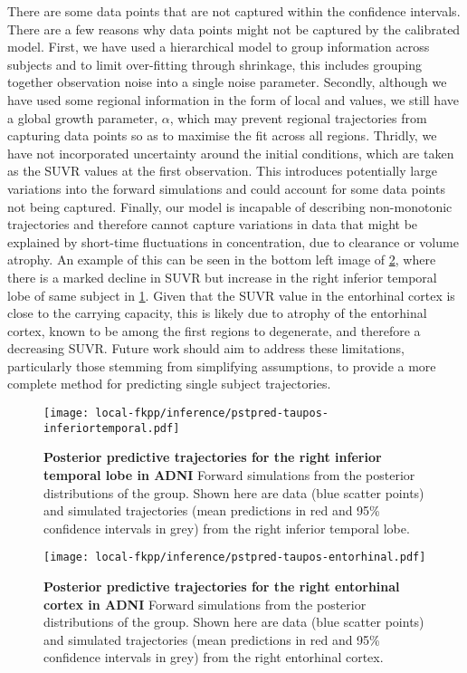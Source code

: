 There are some data points that are not captured within the confidence
intervals. There are a few reasons why data points might not be captured by the
calibrated model. First, we have used a hierarchical model to group information
across subjects and to limit over-fitting through shrinkage, this includes
grouping together observation noise into a single noise parameter. Secondly,
although we have used some regional information in the form of local  and \pI
values, we still have a global growth parameter, $\alpha$, which may prevent
regional trajectories from capturing data points so as to maximise the fit
across all regions. Thridly, we have not incorporated uncertainty around the
initial conditions, which are taken as the SUVR values at the first observation.
This introduces potentially large variations into the forward simulations and
could account for some data points not being captured. Finally, our model is
incapable of describing non-monotonic trajectories and therefore cannot capture
variations in data that might be explained by short-time fluctuations in \TP
concentration, due to clearance or volume atrophy. An example of this can be
seen in the bottom left image of \cref{fig:pstpred-taupos-ec}, where there is a
marked decline in SUVR but increase in the right inferior temporal lobe of same
subject in \cref{fig:pstpred-taupos-it}. Given that the SUVR value in the
entorhinal cortex is close to the carrying capacity, this is likely due to
atrophy of the entorhinal cortex, known to be among the first regions to
degenerate, and therefore a decreasing SUVR. Future work should aim to address 
these limitations, particularly those stemming from simplifying assumptions, to 
provide a more complete method for predicting single subject trajectories.

\begin{figure}[H]
    \centering
    \texttt{[image: local-fkpp/inference/pstpred-taupos-inferiortemporal.pdf]}
    \caption{\textbf{Posterior predictive trajectories for the right inferior
    temporal lobe in ADNI \ABP \TPP}Forward simulations from the posterior
    distributions of the \TPP group. Shown here are data (blue scatter points)
    and simulated trajectories (mean predictions in red and 95\% confidence
    intervals in grey) from the right inferior temporal lobe.}
    \label{fig:pstpred-taupos-it}
\end{figure}

\begin{figure}[H]
    \centering
    \texttt{[image: local-fkpp/inference/pstpred-taupos-entorhinal.pdf]}
    \caption{\textbf{Posterior predictive trajectories for the right entorhinal
    cortex in ADNI \ABP \TPP}Forward simulations from the posterior
    distributions of the \TPP group. Shown here are data (blue scatter points)
    and simulated trajectories (mean predictions in red and 95\% confidence
    intervals in grey) from the right entorhinal cortex.}
    \label{fig:pstpred-taupos-ec}
\end{figure}

